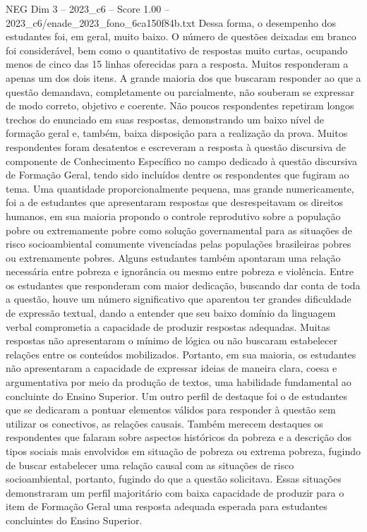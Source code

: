 \begin{textsample}{NEG Dim 3 – 2023\_c6 – Score 1.00 – 2023\_c6/enade\_2023\_fono\_6ca150f84b.txt}
Dessa forma, o desempenho dos estudantes foi, em geral, muito baixo.
O número de questões deixadas em branco foi considerável, bem como o quantitativo de respostas muito curtas, ocupando menos de cinco das 15 linhas oferecidas para a resposta.
Muitos responderam a apenas um dos dois itens.
A grande maioria dos que buscaram responder ao que a questão demandava, completamente ou parcialmente, não souberam se expressar de modo correto, objetivo e coerente.
Não poucos respondentes repetiram longos trechos do enunciado em suas respostas, demonstrando um baixo nível de formação geral e, também, baixa disposição para a realização da prova.
Muitos respondentes foram desatentos e escreveram a resposta à questão discursiva de componente de Conhecimento Específico no campo dedicado à questão discursiva de Formação Geral, tendo sido incluídos dentre os respondentes que fugiram ao tema.
Uma quantidade proporcionalmente pequena, mas grande numericamente, foi a de estudantes que apresentaram respostas que desrespeitavam os direitos humanos, em sua maioria propondo o controle reprodutivo sobre a população pobre ou extremamente pobre como solução governamental para as situações de risco socioambiental comumente vivenciadas pelas populações brasileiras pobres ou extremamente pobres.
Alguns estudantes também apontaram uma relação necessária entre pobreza e ignorância ou mesmo entre pobreza e violência.
Entre os estudantes que responderam com maior dedicação, buscando dar conta de toda a questão, houve um número significativo que aparentou ter grandes dificuldade de expressão textual, dando a entender que seu baixo domínio da linguagem verbal comprometia a capacidade de produzir respostas adequadas.
Muitas respostas não apresentaram o mínimo de lógica ou não buscaram estabelecer relações entre os conteúdos mobilizados.
Portanto, em sua maioria, os estudantes não apresentaram a capacidade de expressar ideias de maneira clara, coesa e argumentativa por meio da produção de textos, uma habilidade fundamental ao concluinte do Ensino Superior.
Um outro perfil de destaque foi o de estudantes que se dedicaram a pontuar elementos válidos para responder à questão sem utilizar os conectivos, as relações causais.
Também merecem destaques os respondentes que falaram sobre aspectos históricos da pobreza e a descrição dos tipos sociais mais envolvidos em situação de pobreza ou extrema pobreza, fugindo de buscar estabelecer uma relação causal com as situações de risco socioambiental, portanto, fugindo do que a questão solicitava.
Essas situações demonstraram um perfil majoritário com baixa capacidade de produzir para o item de Formação Geral uma resposta adequada esperada para estudantes concluintes do Ensino Superior.

\end{textsample}
